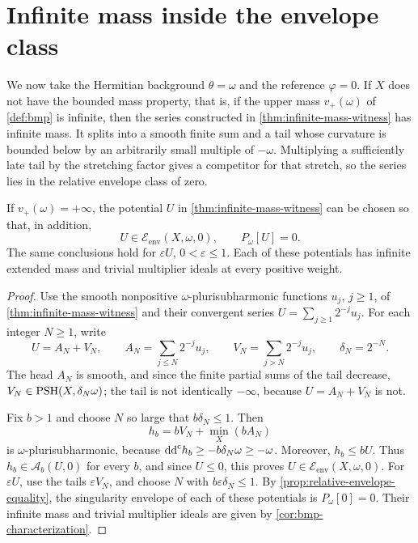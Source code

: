 \section{Infinite mass inside the envelope class}

We now take the Hermitian background $\theta=\omega$ and the reference $\varphi=0$. If $X$ does not have the bounded mass property, that is, if the upper mass $v_+(\omega)$ of \cref{def:bmp} is infinite, then the series constructed in \cref{thm:infinite-mass-witness} has infinite mass. It splits into a smooth finite sum and a tail whose curvature is bounded below by an arbitrarily small multiple of $-\omega$. Multiplying a sufficiently late tail by the stretching factor gives a competitor for that stretch, so the series lies in the relative envelope class of zero.

\begin{proposition}\label{prop:infinite-envelope-class}
If $v_+(\omega)=+\infty$, the potential $U$ in \cref{thm:infinite-mass-witness} can be chosen so that, in addition,
\[
 U\in\mathcal E_{\mathrm{env}}(X,\omega,0),\qquad P_\omega[U]=0.
\]
The same conclusions hold for $\varepsilon U$, $0<\varepsilon\leq1$. Each of these potentials has infinite extended mass and trivial multiplier ideals at every positive weight.
\end{proposition}
\begin{proof}
Use the smooth nonpositive $\omega$-plurisubharmonic functions $u_j$, $j\geq1$, of \cref{thm:infinite-mass-witness} and their convergent series $U=\sum_{j\geq1}2^{-j}u_j$. For each integer $N\geq1$, write
\[
 U=A_N+V_N,\qquad
 A_N=\sum_{j\leq N}2^{-j}u_j,\qquad
 V_N=\sum_{j>N}2^{-j}u_j,\qquad \delta_N=2^{-N}.
\]
The head $A_N$ is smooth, and since the finite partial sums of the tail decrease, $V_N\in\mathrm{PSH}(X,\delta_N\omega)$; the tail is not identically $-\infty$, because $U=A_N+V_N$ is not.

Fix $b>1$ and choose $N$ so large that $b\delta_N\leq1$. Then
\[
 h_b=bV_N+\min_X(bA_N)
\]
is $\omega$-plurisubharmonic, because $\mathrm{dd}^{\mathrm{c}} h_b\geq-b\delta_N\omega\geq-\omega$. Moreover, $h_b\leq bU$. Thus $h_b\in\mathcal A_b(U,0)$ for every $b$, and since $U\leq0$, this proves $U\in\mathcal E_{\mathrm{env}}(X,\omega,0)$. For $\varepsilon U$, use the tails $\varepsilon V_N$, and choose $N$ with $b\varepsilon\delta_N\leq1$. By \cref{prop:relative-envelope-equality}, the singularity envelope of each of these potentials is $P_\omega[0]=0$. Their infinite mass and trivial multiplier ideals are given by \cref{cor:bmp-characterization}.
\end{proof}

